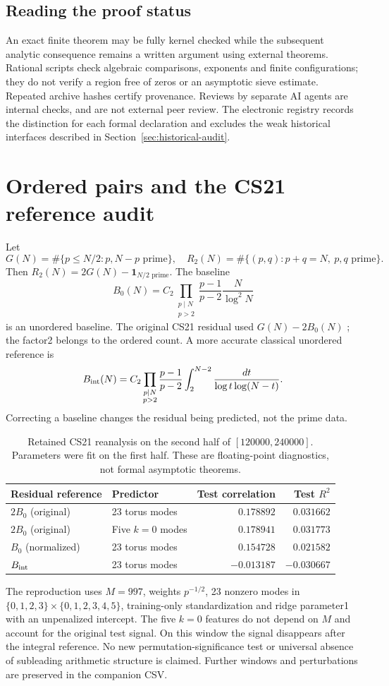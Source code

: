 \documentclass[11pt,a4paper]{article}
\theoremstyle{definition}
\theoremstyle{remark}
\newcommand{\ind}{\mathbf1}
\begin{document}
\subsection{Reading the proof status}
An exact finite theorem may be fully kernel checked while the subsequent analytic consequence remains a written argument using external theorems. Rational scripts check algebraic comparisons, exponents and finite configurations; they do not verify a region free of zeros or an asymptotic sieve estimate. Repeated archive hashes certify provenance. Reviews by separate AI agents are internal checks, and are not external peer review. The electronic registry records the distinction for each formal declaration and excludes the weak historical interfaces described in Section~\ref{sec:historical-audit}.

\section{Ordered pairs and the CS21 reference audit}\label{sec:cs21}
Let
\[G(N)=\#\{p\le N/2:p,N-p\text{ prime}\},\quad
R_2(N)=\#\{(p,q):p+q=N,\ p,q\text{ prime}\}.\]
Then $R_2(N)=2G(N)-\ind_{N/2\text{ prime}}$. The baseline
\[B_0(N)=C_2\prod_{\substack{p\mid N\\p>2}}\frac{p-1}{p-2}\frac{N}{\log^2N}\]
is an unordered baseline. The original CS21 residual used $G(N)-2B_0(N)$ \cite{CS21}; the factor2 belongs to the ordered count. A more accurate classical unordered reference is
\[ B_{\rm int}(N)=C_2\prod_{\substack{p\mid N\\p>2}}\frac{p-1}{p-2}
 \int_2^{N-2}\frac{dt}{\log t\log(N-t)}.\]
Correcting a baseline changes the residual being predicted, not the prime data.

\begin{table}[htbp]\centering\small
\begin{tabular}{@{}llrr@{}}\toprule
Residual reference & Predictor & Test correlation & Test $R^2$\\\midrule
$2B_0$ (original) & 23 torus modes & $0.178892$ & $0.031662$\\
$2B_0$ (original) & Five $k=0$ modes & $0.178941$ & $0.031773$\\
$B_0$ (normalized) & 23 torus modes & $0.154728$ & $0.021582$\\
$B_{\rm int}$ & 23 torus modes & $-0.013187$ & $-0.030667$\\\bottomrule
\end{tabular}
\caption{Retained CS21 reanalysis on the second half of $[120000,240000]$. Parameters were fit on the first half. These are floating-point diagnostics, not formal asymptotic theorems.}\label{tab:cs21}
\end{table}
The reproduction uses $M=997$, weights $p^{-1/2}$, 23 nonzero modes in $\{0,1,2,3\}\times\{0,1,2,3,4,5\}$, training-only standardization and ridge parameter1 with an unpenalized intercept. The five $k=0$ features do not depend on $M$ and account for the original test signal. On this window the signal disappears after the integral reference. No new permutation-significance test or universal absence of subleading arithmetic structure is claimed. Further windows and perturbations are preserved in the companion CSV.
\end{document}

